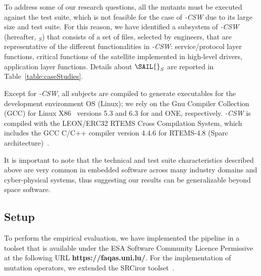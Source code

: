To address some of our research questions, all the mutants must be executed against the test suite, which is not feasible for the case of \SAIL{}\emph{-CSW} due to its large size and test suite. For this reason, we have identified a subsystem of \SAIL{}\emph{-CSW} (hereafter, \emph{\SAIL{}}$_{S}$) that consists of a set of files, selected by \TWO engineers, that are representative of the different functionalities in \SAIL{}\emph{-CSW}: service/protocol layer functions, critical functions of the satellite implemented in high-level drivers, application layer functions.
Details about $\mathit{\SAIL{}}_{S}$ are reported in Table~\ref{table:caseStudies}.


Except for \SAIL{}\emph{-CSW}, all subjects
are compiled to generate executables for the development environment OS (Linux); we rely on the Gnu Compiler Collection (GCC)  for Linux X86~\cite{GCC} versions 5.3 and 6.3 for \MLFS{}{} and ONE, respectively. \SAIL{}\emph{-CSW} is compiled with the
LEON/ERC32 RTEMS Cross Compilation System, which includes the GCC C/C++ compiler version 4.4.6 for  RTEMS-4.8 (Sparc architecture)~\cite{RTEMS}.

It is important to note that the technical and test suite characteristics described above are very common in embedded software across many industry domains and cyber-physical systems, thus suggesting our results can be generalizable beyond space software.







\subsection{Setup}
\label{experimnt:setup}

To perform the empirical evaluation, we have implemented the \APPR pipeline in a toolset that is available under the ESA Software Community Licence Permissive~\cite{ESAlicence} at the following URL \textbf{https://faqas.uni.lu/}.
For the implementation of mutation operators, we extended the SRCiror toolset~\cite{hariri2018srciror}.

